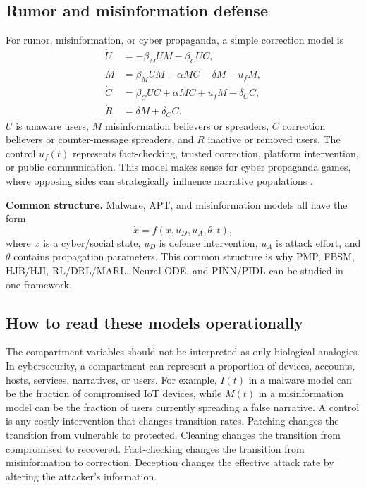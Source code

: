 \documentclass[11pt,a4paper]{article}
\begin{document}
\subsection{Rumor and misinformation defense}
For rumor, misinformation, or cyber propaganda, a simple correction model is
\begin{align}
    \dot{U} &= -\beta_MUM-\beta_CUC, \\
    \dot{M} &= \beta_MUM-\alpha MC-\delta M-u_fM, \\
    \dot{C} &= \beta_CUC+\alpha MC+u_fM-\delta_CC, \\
    \dot{R} &= \delta M+\delta_CC.
\end{align}
$U$ is unaware users, $M$ misinformation believers or spreaders, $C$ correction believers or counter-message spreaders, and $R$ inactive or removed users. The control $u_f(t)$ represents fact-checking, trusted correction, platform intervention, or public communication. This model makes sense for cyber propaganda games, where opposing sides can strategically influence narrative populations \cite{cheng2024propaganda}.

\begin{boxednote}
\textbf{Common structure.}
Malware, APT, and misinformation models all have the form
\[
\dot{x}=f(x,u_D,u_A,\theta,t),
\]
where $x$ is a cyber/social state, $u_D$ is defense intervention, $u_A$ is attack effort, and $\theta$ contains propagation parameters. This common structure is why PMP, FBSM, HJB/HJI, RL/DRL/MARL, Neural ODE, and PINN/PIDL can be studied in one framework.
\end{boxednote}



\subsection{How to read these models operationally}
The compartment variables should not be interpreted as only biological analogies. In cybersecurity, a compartment can represent a proportion of devices, accounts, hosts, services, narratives, or users. For example, $I(t)$ in a malware model can be the fraction of compromised IoT devices, while $M(t)$ in a misinformation model can be the fraction of users currently spreading a false narrative. A control is any costly intervention that changes transition rates. Patching changes the transition from vulnerable to protected. Cleaning changes the transition from compromised to recovered. Fact-checking changes the transition from misinformation to correction. Deception changes the effective attack rate by altering the attacker's information.
\end{document}
